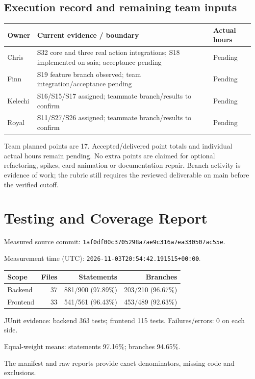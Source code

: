 \documentclass[11pt,a4paper]{article}
\begin{document}
\subsection{Execution record and remaining team inputs}
\begin{tabularx}{\textwidth}{@{}l X l@{}}
\toprule Owner & Current evidence / boundary & Actual hours\\\midrule
Chris & S32 core and three real action integrations; S18 implemented on saia; acceptance pending & Pending\\
Finn & S19 feature branch observed; team integration/acceptance pending & Pending\\
Kelechi & S16/S15/S17 assigned; teammate branch/results to confirm & Pending\\
Royal & S11/S27/S26 assigned; teammate branch/results to confirm & Pending\\\bottomrule
\end{tabularx}

Team planned points are 17. Accepted/delivered point totals and individual actual hours remain pending. No extra points are claimed for optional refactoring, spikes, card animation or documentation repair. Branch activity is evidence of work; the rubric still requires the reviewed deliverable on main before the verified cutoff.

\section{Testing and Coverage Report}
Measured source commit: \texttt{1af0df00c3705298a7ae9c316a7ea330507ac55e}.\par
Measurement time (UTC): \texttt{2026-11-03T20:54:42.191515+00:00}.\par
\begin{tabularx}{\textwidth}{@{}l r r r@{}}\toprule Scope & Files & Statements & Branches\\\midrule
Backend & 37 & 881/900 (97.89\%) & 203/210 (96.67\%)\\
Frontend & 33 & 541/561 (96.43\%) & 453/489 (92.63\%)\\
\bottomrule\end{tabularx}
JUnit evidence: backend 363 tests; frontend 115 tests. Failures/errors: 0 on each side.\par
Equal-weight means: statements 97.16\%; branches 94.65\%.\par
The manifest and raw reports provide exact denominators, missing code and exclusions.
\end{document}

